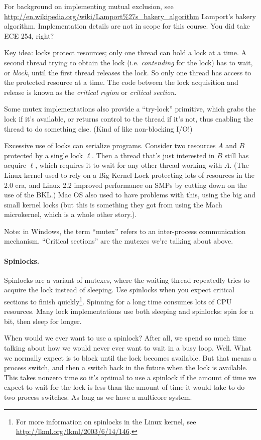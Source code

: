  For background on implementing mutual exclusion, see
 \url{http://en.wikipedia.org/wiki/Lamport\%27s_bakery_algorithm}
      {Lamport's bakery algorithm}. Implementation details are not in
      scope for this course. You did take ECE 254, right?

Key idea: locks protect resources; only one thread
can hold a lock at a time. A second thread trying to obtain the lock
(i.e. \emph{contending} for the lock) has to wait, or \emph{block},
until the first thread releases the lock. So only one thread has
access to the protected resource at a time. The code between the lock
acquisition and release is known as the \emph{critical region} or \emph{critical section}.

Some mutex implementations also provide a ``try-lock'' primitive,
which grabs the lock if it's available, or returns control to the
thread if it's not, thus enabling the thread to do something else. (Kind of
like non-blocking I/O!)

Excessive use of locks can serialize programs. Consider two resources
$A$ and $B$ protected by a single lock $\ell$. Then a thread that's
just interested in $B$ still has acquire $\ell$, which requires it to
wait for any other thread working with $A$. (The Linux kernel used to
rely on a Big Kernel Lock protecting lots of resources in the 2.0 era,
and Linux 2.2 improved performance on SMPs by cutting down on the use
of the BKL.) Mac OS also used to have problems with this, using the
big and small kernel locks (but this is something they got from using
the Mach microkernel, which is a whole other story.).

Note: in Windows, the term ``mutex'' refers to an inter-process
communication mechanism. ``Critical sections'' are the mutexes we're
talking about above.

\paragraph{Spinlocks.} Spinlocks are a variant of mutexes, where the
waiting thread repeatedly tries to acquire the lock instead of sleeping.
Use spinlocks when you expect critical sections to finish 
quickly\footnote{For more information on spinlocks in the Linux
kernel, see \url{http://lkml.org/lkml/2003/6/14/146}.}. Spinning
for a long time consumes lots of CPU resources. Many lock
implementations use both sleeping and spinlocks: spin for a bit,
then sleep for longer. 

When would we ever want to use a spinlock? After all, we spend so much time talking about how we would never ever want to wait in a busy loop. Well. What we normally expect is to block until the lock becomes available. But that means a process switch, and then a switch back in the future when the lock is available. This takes nonzero time so it's optimal to use a spinlock if the amount of time we expect to wait for the lock is less than the amount of time it would take to do two process switches. As long as we have a multicore system.

